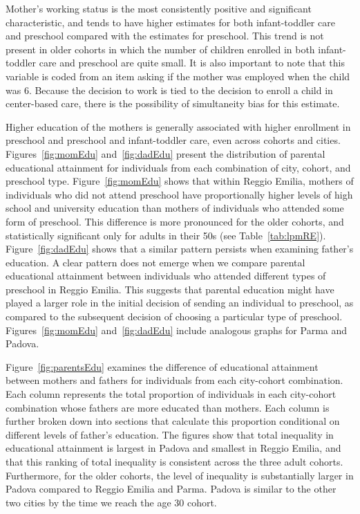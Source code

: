 Mother's working status is the most consistently positive and significant characteristic, and tends to have higher estimates for both infant-toddler care and preschool compared with the estimates for preschool. This trend is not present in older cohorts in which the number of children enrolled in both infant-toddler care and preschool are quite small. It is also important to note that this variable is coded from an item asking if the mother was employed when the child was 6. Because the decision to work is tied to the decision to enroll a child in center-based care, there is the possibility of simultaneity bias for this estimate. 

Higher education of the mothers is generally associated with higher enrollment in preschool and preschool and infant-toddler care, even across cohorts and cities. Figures~\ref{fig:momEdu} and~\ref{fig:dadEdu} present the distribution of parental educational attainment for individuals from each combination of city, cohort, and preschool type. Figure~\ref{fig:momEdu} shows that within Reggio Emilia, mothers of individuals who did not attend preschool have proportionally higher levels of high school and university education than mothers of individuals who attended some form of preschool. This difference is more pronounced for the older cohorts, and statistically significant only for adults in their 50s (see Table~\ref{tab:lpmRE}). Figure~\ref{fig:dadEdu} shows that a similar pattern persists when examining father's education. A clear pattern does not emerge when we compare parental educational attainment between individuals who attended different types of preschool in Reggio Emilia. This suggests that parental education might have played a larger role in the initial decision of sending an individual to preschool, as compared to the subsequent decision of choosing a particular type of preschool. Figures~\ref{fig:momEdu} and~\ref{fig:dadEdu} include analogous graphs for Parma and Padova.

Figure~\ref{fig:parentsEdu} examines the difference of educational attainment between mothers and fathers for individuals from each city-cohort combination. Each column represents the total proportion of individuals in each city-cohort combination whose fathers are more educated than mothers. Each column is further broken down into sections that calculate this proportion conditional on different levels of father's education. The figures show that total inequality in educational attainment is largest in Padova and smallest in Reggio Emilia, and that this ranking of total inequality is consistent across the three adult cohorts. Furthermore, for the older cohorts, the level of inequality is substantially larger in Padova compared to Reggio Emilia and Parma. Padova is similar to the other two cities by the time we reach the age 30 cohort. 


